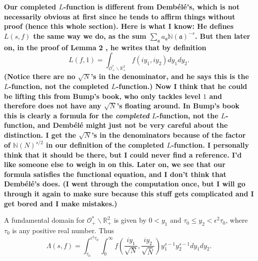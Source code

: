 \documentclass{article}
\theoremstyle{plain}
\begin{document}
\textbf{Our completed $L$-function is different from Demb\'{e}l\'{e}'s, which is not necessarily obvious at first since he tends to affirm things without proof (hence this whole section). Here is what I know: He defines $L(s,f)$ the same way we do, as the sum $\sum_{\mathfrak{a}}a_{\mathfrak{a}}\mathbb{N}(\mathfrak{a})^{-s}$. But then later on, in the proof of Lemma 2 \cite{dembele}, he writes that by definition
\begin{equation*}
L(f,1)= \int_{\mathcal{O}_+^*\backslash \mathbb{R}^2_+} f\left(iy_1,iy_2\right) dy_1 dy_2.
\end{equation*}
(Notice there are no $\sqrt{N}$'s in the denominator, and he says this is the $L$-function, not the completed $L$-function.) Now I think that he could be lifting this from Bump's book, who only tackles level $1$ and therefore does not have any $\sqrt{N}$'s floating around. In Bump's book this is clearly a formula for the \emph{completed} $L$-function, not the $L$-function, and Demb\'{e}l\'{e} might just not be very careful about the distinction. I get the $\sqrt{N}$'s in the denominators because of the factor of $\mathbb{N}(N)^{s/2}$ in our definition of the completed $L$-function. I personally think that it should be there, but I could never find a reference. I'd like someone else to weigh in on this. Later on, we see that our formula satisfies the functional equation, and I don't think that Demb\'{e}l\'{e}'s does. (I went through the computation once, but I will go through it again to make sure because this stuff gets complicated and I get bored and I make mistakes.)}

A fundamental domain for $\mathcal{O}_+^*\backslash \mathbb{R}^2_+$ is given by $0<y_1$ and $\tau_0 \leq y_2 < \epsilon^2 \tau_0$, where $\tau_0$ is any positive real number. Thus
\begin{equation*}
\Lambda(s,f)= \int_{\tau_0}^{\epsilon^2 \tau_0}\int_{0}^{\infty} f\left(\frac{iy_1}{\sqrt{N}},\frac{iy_2}{\sqrt{\bar{N}}}\right) y_1^{s-1}y_2^{s-1} dy_1 dy_2.
\end{equation*}
\end{document}
